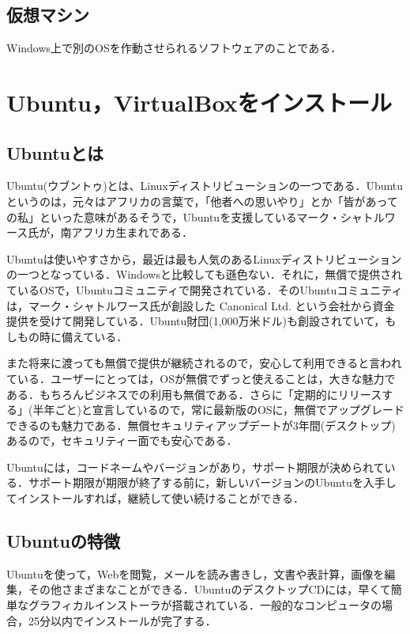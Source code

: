 \subsection{仮想マシン}

Windows上で別のOSを作動させられるソフトウェアのことである．

\section{Ubuntu，VirtualBoxをインストール}

\subsection{Ubuntuとは}
Ubuntu(ウブントゥ)とは、Linuxディストリビューションの一つである．Ubuntuというのは，元々はアフリカの言葉で，「他者への思いやり」とか「皆があっての私」といった意味があるそうで，Ubuntuを支援しているマーク・シャトルワース氏が，南アフリカ生まれである．

Ubuntuは使いやすさから，最近は最も人気のあるLinuxディストリビューションの一つとなっている．Windowsと比較しても遜色ない．それに，無償で提供されているOSで，Ubuntuコミュニティで開発されている．そのUbuntuコミュニティは，マーク・シャトルワース氏が創設した Canonical Ltd. という会社から資金提供を受けて開発している．Ubuntu財団(1,000万米ドル)も創設されていて，もしもの時に備えている．

また将来に渡っても無償で提供が継続されるので，安心して利用できると言われている．ユーザーにとっては，OSが無償でずっと使えることは，大きな魅力である．もちろんビジネスでの利用も無償である．さらに「定期的にリリースする」(半年ごと)と宣言しているので，常に最新版のOSに，無償でアップグレードできるのも魅力である．無償セキュリティアップデートが3年間(デスクトップ)あるので，セキュリティー面でも安心である．

Ubuntuには，コードネームやバージョンがあり，サポート期限が決められている．サポート期限が期限が終了する前に，新しいバージョンのUbuntuを入手してインストールすれば，継続して使い続けることができる\cite{ubuntu}．

\subsection{Ubuntuの特徴}

Ubuntuを使って，Webを閲覧，メールを読み書きし，文書や表計算，画像を編集，その他さまざまなことができる．UbuntuのデスクトップCDには，早くて簡単なグラフィカルインストーラが搭載されている．一般的なコンピュータの場合，25分以内でインストールが完了する．

